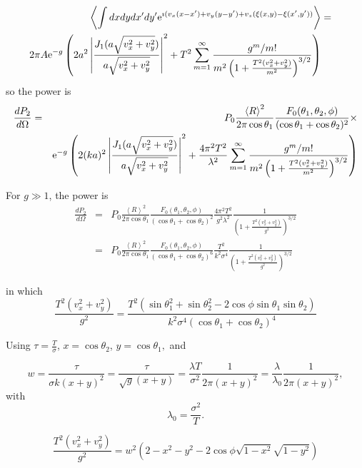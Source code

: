 \documentclass[11pt,openany]{report}
\newcommand{\der}[2]{\frac{d {#1}}{d {#2}}}
\newcommand{\e}{{\rm e}}
\begin{document}
{{\begin{eqnarray}
\left<\int dx dydx'dy'\e^{\imath( v_{x}(x-x')+v_{y}(y-y')+v_{z}(\xi(x,y)-\xi(x',y'))}\right>&=&\\
2\pi A\e^{-g}\left(2a^{2}\left|\frac{J_{1}(a\sqrt{v_{x}^{2}+v_{y}^{2}})}{a\sqrt{v_{x}^{2}+v_{y}^{2}}}\right|^{2}+T^{2}\sum_{m=1}^{\infty}\frac{g^{m}/m!}{m^{2}\left(1+\frac{T^{2}(v_{x}^{2}+v_{y}^{2})}{m^{2}}\right)^{3/2}}\right)\end{eqnarray}
so the power is
\begin{eqnarray}
\der{P_{2}}{\Omega}&=&P_{0}\frac{\left<R\right>^{2}}{2\pi\cos\theta_{1}}\frac{F_{0}(\theta_{1},\theta_{2},\phi)}{(\cos{\theta_{1}}+\cos{\theta_{2}})^{2}}\times\\
&&\e^{-g}\left(2(ka)^{2}\left|\frac{J_{1}(a\sqrt{v_{x}^{2}+v_{y}^{2}})}{a\sqrt{v_{x}^{2}+v_{y}^{2}}}\right|^{2}+\frac{4\pi^{2}T^{2}}{\lambda^{2}}\sum_{m=1}^{\infty}\frac{g^{m}/m!}{m^{2}\left(1+\frac{T^{2}(v_{x}^{2}+v_{y}^{2})}{m^{2}}\right)^{3/2}}\right)\end{eqnarray}


For $g\gg 1$, the power is
\begin{eqnarray}
\der{P_{2}}{\Omega}&=&P_{0}\frac{\left<R\right>^{2}}{2\pi\cos\theta_{1}}\frac{F_{0}(\theta_{1},\theta_{2},\phi)}{(\cos{\theta_{1}}+\cos{\theta_{2}})^{2}}\frac{4\pi^{2}T^{2}}{g^{2}\lambda^{2}}\frac{1}{\left(1+\frac{T^{2}(v_{x}^{2}+v_{y}^{2})}{g^{2}}\right)^{3/2}}\\&=&
P_{0}\frac{\left<R\right>^{2}}{2\pi\cos\theta_{1}}\frac{F_{0}(\theta_{1},\theta_{2},\phi)}{(\cos{\theta_{1}}+\cos{\theta_{2}})^{6}}\frac{T^{2}}{k^{2}\sigma^{4}}\frac{1}{\left(1+\frac{T^{2}(v_{x}^{2}+v_{y}^{2})}{g^{2}}\right)^{3/2}}
\end{eqnarray}

in which
$$\frac{T^{2}(v_{x}^{2}+v_{y}^{2})}{g^{2}}=\frac{T^{2}\left(\sin\theta_{1}^{2}+\sin\theta_{2}^{2}-2\cos\phi\sin\theta_{1}\sin\theta_{2}\right)}{k^{2}\sigma^{4}(\cos{\theta_{1}}+\cos{\theta_{2}})^{4}}$$

Using $\tau=\frac{T}{\sigma}$, $x=\cos\theta_{2}$, $y=\cos\theta_{1},$ and

$$w=\frac{\tau}{\sigma k(x+y)^{2}}=\frac{\tau}{\sqrt{g}(x+y)}=\frac{\lambda T}{\sigma^{2}}\frac{1}{2\pi(x+y)^{2}}=\frac{\lambda}{\lambda_{0}}\frac{1}{2\pi(x+y)^{2}},$$
with
$$\lambda_{0}=\frac{\sigma^{2}}{T}.$$


$$\frac{T^{2}(v_{x}^{2}+v_{y}^{2})}{g^{2}}=w^{2}\left(2-x^{2}-y^{2}-2\cos\phi\sqrt{1-x^{2}}\sqrt{1-y^{2}}\right)$$

}}
\end{document}
